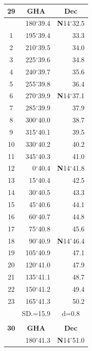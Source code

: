 \documentclass[10pt, a4paper]{report}
\begin{document}
\begin{scriptsize}
\begin{tabular*}{0.2\textwidth}[t]{@{\extracolsep{\fill}}|c|rr|}
\hline
\multicolumn{1}{|c|}{\rule{0pt}{2.6ex}\textbf{29}} & \multicolumn{1}{c}{\textbf{GHA}} & \multicolumn{1}{c|}{\textbf{Dec}}\\
\hline\rule{0pt}{2.6ex}\noindent
0 & 180$^\circ$39.4 & \textbf{N}14$^\circ$32.5\\
1 & 195$^\circ$39.4 & 33.3\\
2 & 210$^\circ$39.5 & 34.0\\
3 & 225$^\circ$39.6 & \raisebox{0.24ex}{\boldmath$\cdot$~\boldmath$\cdot$~~}34.8\\
4 & 240$^\circ$39.7 & 35.6\\
5 & 255$^\circ$39.8 & 36.4\\[2Pt]
6 & 270$^\circ$39.9 & \textbf{N}14$^\circ$37.1\\
7 & 285$^\circ$39.9 & 37.9\\
8 & 300$^\circ$40.0 & 38.7\\
9 & 315$^\circ$40.1 & \raisebox{0.24ex}{\boldmath$\cdot$~\boldmath$\cdot$~~}39.5\\
10 & 330$^\circ$40.2 & 40.2\\
11 & 345$^\circ$40.3 & 41.0\\[2Pt]
12 & 0$^\circ$40.4 & \textbf{N}14$^\circ$41.8\\
13 & 15$^\circ$40.4 & 42.5\\
14 & 30$^\circ$40.5 & 43.3\\
15 & 45$^\circ$40.6 & \raisebox{0.24ex}{\boldmath$\cdot$~\boldmath$\cdot$~~}44.1\\
16 & 60$^\circ$40.7 & 44.8\\
17 & 75$^\circ$40.8 & 45.6\\[2Pt]
18 & 90$^\circ$40.9 & \textbf{N}14$^\circ$46.4\\
19 & 105$^\circ$40.9 & 47.1\\
20 & 120$^\circ$41.0 & 47.9\\
21 & 135$^\circ$41.1 & \raisebox{0.24ex}{\boldmath$\cdot$~\boldmath$\cdot$~~}48.7\\
22 & 150$^\circ$41.2 & 49.4\\
23 & 165$^\circ$41.3 & 50.2\\
\hline
\rule{0pt}{2.4ex} & \multicolumn{1}{c}{SD.=15.9} & \multicolumn{1}{c|}{d=0.8}\\
\hline
\multicolumn{1}{c}{}\\[-0.5ex]\hline
\multicolumn{1}{|c|}{\rule{0pt}{2.6ex}\textbf{30}} & \multicolumn{1}{c}{\textbf{GHA}} & \multicolumn{1}{c|}{\textbf{Dec}}\\
\hline\rule{0pt}{2.6ex}\noindent
0 & 180$^\circ$41.3 & \textbf{N}14$^\circ$51.0\\

\end{tabular*}
\end{scriptsize}
\end{document}
